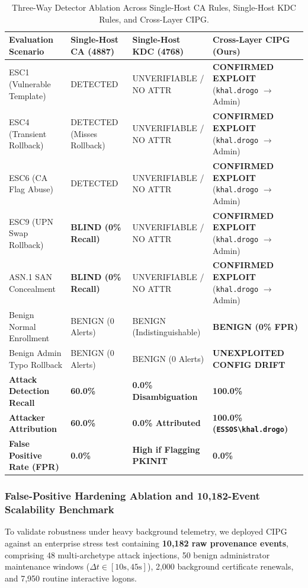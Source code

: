 \begin{table}[htbp]
\centering
\small
\caption{Three-Way Detector Ablation Across Single-Host CA Rules, Single-Host KDC Rules, and Cross-Layer CIPG.}
\label{tab:three_way_ablation}
\begin{tabularx}{\textwidth}{lXXX}
\toprule
\textbf{Evaluation Scenario} & \textbf{Single-Host CA (4887)} & \textbf{Single-Host KDC (4768)} & \textbf{Cross-Layer CIPG (Ours)} \\
\midrule
ESC1 (Vulnerable Template) & DETECTED & UNVERIFIABLE / NO ATTR & \textbf{CONFIRMED EXPLOIT} (\texttt{khal.drogo} $\to$ Admin) \\
ESC4 (Transient Rollback) & DETECTED (Misses Rollback) & UNVERIFIABLE / NO ATTR & \textbf{CONFIRMED EXPLOIT} (\texttt{khal.drogo} $\to$ Admin) \\
ESC6 (CA Flag Abuse) & DETECTED & UNVERIFIABLE / NO ATTR & \textbf{CONFIRMED EXPLOIT} (\texttt{khal.drogo} $\to$ Admin) \\
ESC9 (UPN Swap Rollback) & \textbf{BLIND (0\% Recall)} & UNVERIFIABLE / NO ATTR & \textbf{CONFIRMED EXPLOIT} (\texttt{khal.drogo} $\to$ Admin) \\
ASN.1 SAN Concealment & \textbf{BLIND (0\% Recall)} & UNVERIFIABLE / NO ATTR & \textbf{CONFIRMED EXPLOIT} (\texttt{khal.drogo} $\to$ Admin) \\
Benign Normal Enrollment & BENIGN (0 Alerts) & BENIGN (Indistinguishable) & \textbf{BENIGN (0\% FPR)} \\
Benign Admin Typo Rollback & BENIGN (0 Alerts) & BENIGN (0 Alerts) & \textbf{UNEXPLOITED CONFIG DRIFT} \\
\midrule
\textbf{Attack Detection Recall} & \textbf{60.0\%} & \textbf{0.0\% Disambiguation} & \textbf{100.0\%} \\
\textbf{Attacker Attribution} & \textbf{60.0\%} & \textbf{0.0\% Attributed} & \textbf{100.0\% (\texttt{ESSOS\textbackslash khal.drogo})} \\
\textbf{False Positive Rate (FPR)} & \textbf{0.0\%} & \textbf{High if Flagging PKINIT} & \textbf{0.0\%} \\
\bottomrule
\end{tabularx}
\end{table}

\subsubsection{False-Positive Hardening Ablation and 10,182-Event Scalability Benchmark}
\label{sec:fp_hardening_benchmark}
To validate robustness under heavy background telemetry, we deployed CIPG against an enterprise stress test containing \textbf{10,182 raw provenance events}, comprising 48 multi-archetype attack injections, 50 benign administrator maintenance windows ($\Delta t \in [10\text{s}, 45\text{s}]$), 2,000 background certificate renewals, and 7,950 routine interactive logons.

